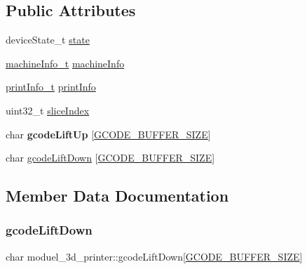 \subsection*{Public Attributes}
\begin{DoxyCompactItemize}
\item 
device\+State\+\_\+t \hyperlink{structmoduel__3d__printer_a2707ace05a8c18a1367ef543d40d2408}{state}
\item 
\hyperlink{structmachine__information}{machine\+Info\+\_\+t} \hyperlink{structmoduel__3d__printer_a06b1b5e4781c4fcd39a12202ec7fc116}{machine\+Info}
\item 
\hyperlink{structprint__information}{print\+Info\+\_\+t} \hyperlink{structmoduel__3d__printer_a765c2d9f58cf2a23cd8c07b24a4e4b88}{print\+Info}
\item 
uint32\+\_\+t \hyperlink{structmoduel__3d__printer_a9a880c5b153a9a56bdd6be0c8ab8c6dd}{slice\+Index}
\item 
\mbox{\label{structmoduel__3d__printer_a1ddff8ca1cf3222b0565a52d97026500}} 
char {\bfseries gcode\+Lift\+Up} \mbox{[}\hyperlink{SN__MODULE__3D__PRINTER_8c_af6168edd26520974b8660182d040051a}{G\+C\+O\+D\+E\+\_\+\+B\+U\+F\+F\+E\+R\+\_\+\+S\+I\+ZE}\mbox{]}
\item 
char \hyperlink{structmoduel__3d__printer_a92a0d79f578eb52b1cd12982a51d4784}{gcode\+Lift\+Down} \mbox{[}\hyperlink{SN__MODULE__3D__PRINTER_8c_af6168edd26520974b8660182d040051a}{G\+C\+O\+D\+E\+\_\+\+B\+U\+F\+F\+E\+R\+\_\+\+S\+I\+ZE}\mbox{]}
\end{DoxyCompactItemize}


\subsection{Member Data Documentation}
\mbox{\label{structmoduel__3d__printer_a92a0d79f578eb52b1cd12982a51d4784}} 
\subsubsection{\texorpdfstring{gcode\+Lift\+Down}{gcodeLiftDown}}
{\footnotesize\ttfamily char moduel\+\_\+3d\+\_\+printer\+::gcode\+Lift\+Down\mbox{[}\hyperlink{SN__MODULE__3D__PRINTER_8c_af6168edd26520974b8660182d040051a}{G\+C\+O\+D\+E\+\_\+\+B\+U\+F\+F\+E\+R\+\_\+\+S\+I\+ZE}\mbox{]}}

